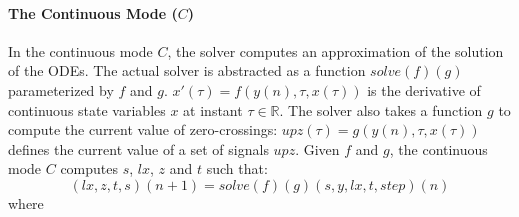 \documentclass[11pt,titlepage,twoside]{report}
\newcommand{\lx}{\ensuremath{\mathit{lx}}}
\newcommand{\Solve}[2]{\mathit{solve}({#1})({#2})}
\newcommand{\bR}{\mathbb{R}}
\begin{document}
\paragraph{The Continuous Mode ($C$)}
In the continuous mode $C$, the solver computes
  an approximation of the solution of the ODEs. The actual solver is
  abstracted as a function $\Solve{f}{g}$ parameterized by $f$ and
  $g$. $x'(\tau) = f(y(n), \tau, x(\tau))$ is the derivative of continuous
  state variables $x$ at instant $\tau \in \bR$.
  The solver also takes a function $g$ to compute the current value of
  zero-crossings: \mbox{$upz(\tau) = g(y(n), \tau, x(\tau))$} defines the
  current value of a set of signals $upz$.
  Given $f$ and $g$, the continuous mode $C$ computes
  $s$, $\lx$, $z$ and $t$ such that:
  \[
    (\lx, z, t, s)(n+1) = \Solve{f}{g}(s, y, \lx, t, step)(n)
  \]
  where
\end{document}
